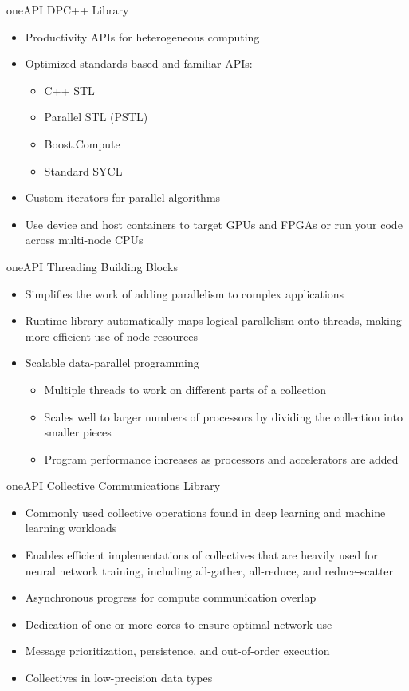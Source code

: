 \documentclass[aspectratio=169]{beamer}
\begin{document}
\begin{frame}{oneAPI DPC++ Library}
\begin{itemize}
  \item Productivity APIs for heterogeneous computing
  \item Optimized standards-based and familiar APIs:
  \begin{itemize}
    \item C++ STL
    \item Parallel STL (PSTL)
    \item Boost.Compute
    \item Standard SYCL
  \end{itemize}
  \item Custom iterators for parallel algorithms
  \item Use device and host containers to target GPUs and FPGAs or run your code across multi-node CPUs
\end{itemize}
\end{frame}

\begin{frame}{oneAPI Threading Building Blocks}
\begin{itemize}
  \item Simplifies the work of adding parallelism to complex applications
  \item Runtime library automatically maps logical parallelism onto threads, making more efficient use of node resources
  \item Scalable data-parallel programming
    \begin{itemize}
    \item Multiple threads to work on different parts of a collection
    \item Scales well to larger numbers of processors by dividing the collection into smaller pieces
    \item Program performance increases as processors and accelerators are added
  \end{itemize}
\end{itemize}
\end{frame}

\begin{frame}{oneAPI Collective Communications Library}
\begin{itemize}
  \item Commonly used collective operations found in deep learning and machine learning workloads
  \item Enables efficient implementations of collectives that are heavily used for neural network training, including all-gather, all-reduce, and reduce-scatter
  \item Asynchronous progress for compute communication overlap
  \item Dedication of one or more cores to ensure optimal network use
  \item Message prioritization, persistence, and out-of-order execution
  \item Collectives in low-precision data types
\end{itemize}
\end{frame}
\end{document}
